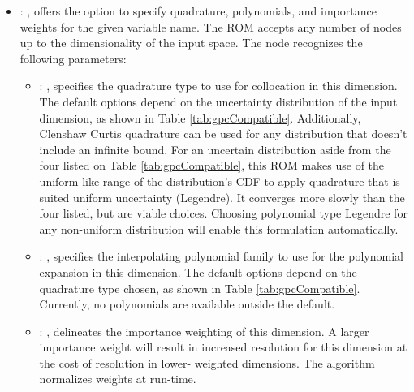 \begin{itemize}
    \item {}: , 
      offers the option to specify quadrature, polynomials, and importance weights for the given
      variable name.  The ROM accepts any number of  nodes up to the
      dimensionality of the input space.
      The  node recognizes the following parameters:
        \begin{itemize}
          \item {}: , 
            specifies the quadrature type to use for collocation in this dimension.  The default
            options                   depend on the uncertainty distribution of the input dimension,
            as shown in Table                   \ref{tab:gpcCompatible}. Additionally, Clenshaw
            Curtis quadrature can be used for any                   distribution that doesn't
            include an infinite bound.                                      \nb For an uncertain distribution aside from
            the four listed on Table                   \ref{tab:gpcCompatible}, this ROM
            makes use of the uniform-like range of the distribution's CDF to apply quadrature that
            is                   suited uniform uncertainty (Legendre).  It converges more slowly
            than the four listed, but are                   viable choices.  Choosing polynomial
            type Legendre for any non-uniform distribution will                   enable this
            formulation automatically.
          \item {}: , 
            specifies the interpolating polynomial family to use for the polynomial expansion in
            this                   dimension.  The default options depend on the quadrature type
            chosen, as shown in Table                   \ref{tab:gpcCompatible}.  Currently, no
            polynomials are available outside the                   default. 
          \item {}: , 
            delineates the importance weighting of this dimension.  A larger importance weight will
            result in increased resolution for this dimension at the cost of resolution in lower-
            weighted                   dimensions.  The algorithm normalizes weights at run-time. 
      \end{itemize}
  \end{itemize}

